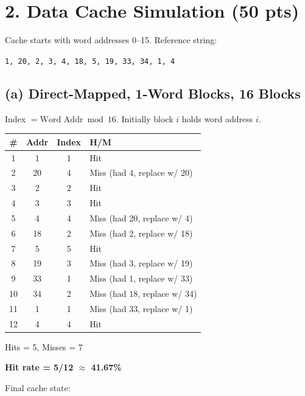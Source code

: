 \documentclass[11pt]{article}
\begin{document}
\newpage
\section*{2. Data Cache Simulation (50 pts)}

Cache starts with word addresses 0--15. Reference string:
\begin{center}
\texttt{1, 20, 2, 3, 4, 18, 5, 19, 33, 34, 1, 4}
\end{center}

\subsection*{(a) Direct-Mapped, 1-Word Blocks, 16 Blocks}

Index $= \text{Word Addr} \bmod 16$. Initially block $i$ holds word address $i$.

\medskip
\begin{center}
\begin{tabular}{|c|c|c|l|}
\hline
\textbf{\#} & \textbf{Addr} & \textbf{Index} & \textbf{H/M} \\
\hline
1 & 1 & 1 & Hit \\
2 & 20 & 4 & Miss (had 4, replace w/ 20) \\
3 & 2 & 2 & Hit \\
4 & 3 & 3 & Hit \\
5 & 4 & 4 & Miss (had 20, replace w/ 4) \\
6 & 18 & 2 & Miss (had 2, replace w/ 18) \\
7 & 5 & 5 & Hit \\
8 & 19 & 3 & Miss (had 3, replace w/ 19) \\
9 & 33 & 1 & Miss (had 1, replace w/ 33) \\
10 & 34 & 2 & Miss (had 18, replace w/ 34) \\
11 & 1 & 1 & Miss (had 33, replace w/ 1) \\
12 & 4 & 4 & Hit \\
\hline
\end{tabular}
\end{center}

\medskip
Hits = 5, Misses = 7

\textbf{Hit rate = 5/12 $\approx$ 41.67\%}

\medskip
Final cache state:
\end{document}
